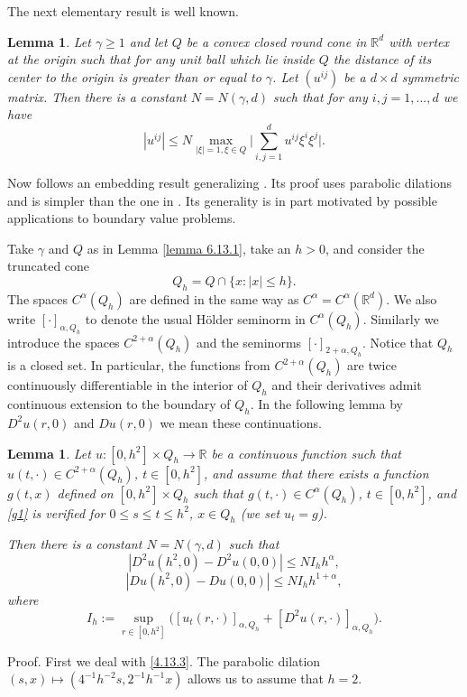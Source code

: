 \documentclass[reqno,12pt]{amsart}
\newtheorem{lemma}[theorem]{Lemma}
\theoremstyle{definition}
\theoremstyle{remark}
\begin{document}
 The next elementary result is well known.
\begin{lemma}
                                      \label{lemma 6.13.1}
Let $\gamma\geq1$ and let
  $Q$  be a convex closed round   cone in ${\mathbb{R}}^d$
   with vertex at the origin such that
for any unit ball which lie inside $Q$ the distance of its center
to the origin is greater than or equal to $\gamma$. Let $(u^{ij})$
be a $d\times d$ symmetric matrix. Then there is a constant
$N=N(\gamma,d)$ such that for any $i,j=1,...,d$ we have
$$
|u^{ij}|\leq N\max_{|\xi|=1,\xi\in Q}\big|
\sum_{i,j=1}^{d}u^{ij}\xi^{i}\xi^{j}\big|.
$$
\end{lemma}

   Now follows an embedding result
generalizing
   \cite[Lemma 1]{Kn}. Its proof uses parabolic dilations
    and  is simpler   than  the  one in \cite{Kn}.
     Its generality is
   in part
motivated by possible applications to boundary value
    problems.

Take $\gamma$ and  $Q$   as in Lemma \ref{lemma
6.13.1}, take an $h>0$, and consider the truncated cone
   $$
Q_{h}= Q\cap \{x:|x|\leq h\} .
    $$
    The  spaces   $C^{\alpha} (Q_{h})$
    are defined in the same way as $C^{\alpha}=C^{\alpha}
({\mathbb{R}}^d)$. We also write $[\cdot]_{\alpha, Q_{h}}$ to denote
     the usual H\"older seminorm in $C^{\alpha} (Q_{h})$.
Similarly we introduce the spaces $C^{2+ \alpha}(Q_{h})$ and the
seminorms $[\cdot]_{2+\alpha, Q_{h}}$. Notice that $Q_{h}$ is a
closed set. In particular, the functions from $C^{2+
\alpha}(Q_{h})$ are twice continuously differentiable in the
interior of $Q_{h}$ and their derivatives admit continuous
extension to the boundary of $Q_{h}$. In the following lemma by
$D^{2}u(r,0)$ and $Du(r,0)$ we mean these continuations.

\begin{lemma}

                                        \label{lemma 4.13.2}
     Let $u: [0,h^{2}] \times Q_{h} \to {\mathbb{R}}$ be a
   continuous  function such that
    $u(t, \cdot ) \in C^{2+ \alpha}  (Q_{h})$, $t \in [0,h^{2}]$,
   and assume that there
   exists a   function
    $g(t,x)$ defined on $[0,h^{2}] \times Q_{h}$
    such that  $ g(t, \cdot ) \in C^{\alpha } (Q_{h})$,
$t \in [0,h^{2}]$, and
   \eqref{g1} is verified for $0 \le s\le t \le h^{2} $,
$x \in Q_{h}$
   (we set $u_t =g $).

Then there is a constant $N=N(\gamma,d)$ such that
\begin{equation}
                                                  \label{4.13.3}
|D^{2}u(h^{2},0)-D^{2}u(0,0)|\leq N I_{h}h^{\alpha},
  \end{equation}
\begin{equation}
                                                  \label{4.14.1}
|Du(h^{2},0)-Du(0,0)|\leq NI_{h}h^{1+\alpha},
  \end{equation}
where
$$
  I_{h}:=\sup_{r\in[0,h^{2}]} \big([u_{t}(r,\cdot)]_{\alpha, Q_{h}}
+[D^2 u (r,\cdot)]_{ \alpha ,Q_{h} }\big).
$$

\end{lemma}
   Proof.  First we deal with \eqref{4.13.3}.
The parabolic dilation  $(s,x) \mapsto (4^{-1}h^{-2}s,2^{-1}h^{-1}
x )$  allows us to assume that $h=2$.
\end{document}
